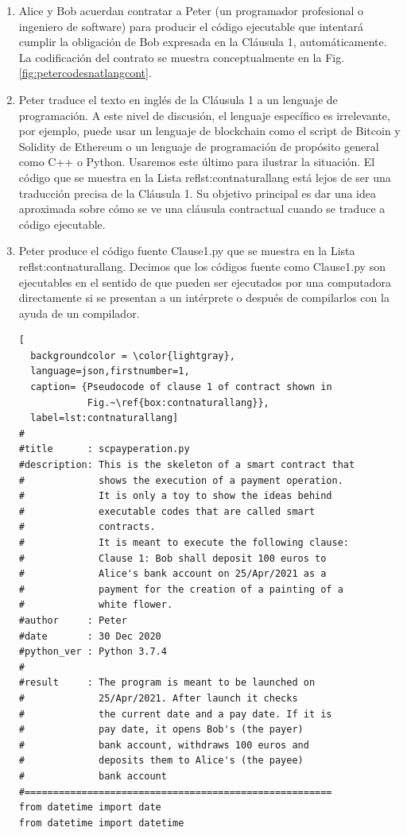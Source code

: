 \documentclass[12pt]{report} %
\begin{document}
\begin{enumerate}
    \item Alice y Bob acuerdan contratar a Peter (un programador profesional o ingeniero de software) para producir el código ejecutable que intentará cumplir la obligación de Bob expresada en la Cláusula 1, automáticamente. La codificación del contrato se muestra conceptualmente en la Fig. \ref{fig:petercodesnatlangcont}.
    
    \item Peter traduce el texto en inglés de la Cláusula 1 a un lenguaje de programación. A este nivel de discusión, el lenguaje específico es irrelevante, por ejemplo, puede usar un lenguaje de blockchain como el script de Bitcoin y Solidity de Ethereum o un lenguaje de programación de propósito general como C++ o Python. Usaremos este último para ilustrar la situación. El código que se muestra en la Lista ref{lst:contnaturallang}  está lejos de ser una traducción precisa de la Cláusula 1. Su objetivo principal es dar una idea aproximada sobre cómo se ve una cláusula contractual cuando se traduce a código ejecutable.

    \item Peter produce el código fuente Clause1.py que se muestra en la Lista ref{lst:contnaturallang}. Decimos que los códigos fuente como Clause1.py son ejecutables en el sentido de que pueden ser ejecutados por una computadora directamente si se presentan a un intérprete o después de compilarlos con la ayuda de un compilador.

   
   \begin{lstlisting}[
  backgroundcolor = \color{lightgray},
  language=json,firstnumber=1,
  caption= {Pseudocode of clause 1 of contract shown in 
            Fig.~\ref{box:contnaturallang}},
  label=lst:contnaturallang]
#
#title      : scpayperation.py
#description: This is the skeleton of a smart contract that
#             shows the execution of a payment operation.
#             It is only a toy to show the ideas behind
#             executable codes that are called smart 
#             contracts.
#             It is meant to execute the following clause:
#             Clause 1: Bob shall deposit 100 euros to
#             Alice's bank account on 25/Apr/2021 as a
#             payment for the creation of a painting of a 
#             white flower.
#author     : Peter
#date       : 30 Dec 2020
#python_ver : Python 3.7.4
#
#result     : The program is meant to be launched on
#             25/Apr/2021. After launch it checks
#             the current date and a pay date. If it is
#             pay date, it opens Bob's (the payer)
#             bank account, withdraws 100 euros and
#             deposits them to Alice's (the payee)
#             bank account
#======================================================
from datetime import date
from datetime import datetime
   

\end{lstlisting}
\end{enumerate}
\end{document}
